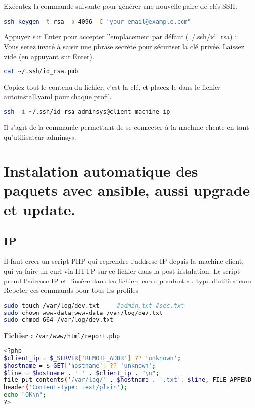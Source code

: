 \documentclass[a4paper,12pt]{article}
\begin{document}
\newline
Exécutez la commande suivante pour générer une nouvelle paire de clés SSH:
\begin{lstlisting}[language=bash]
ssh-keygen -t rsa -b 4096 -C "your_email@example.com"
\end{lstlisting}
Appuyez sur Enter pour accepter l'emplacement par défaut (~/.ssh/id\_rsa)
:
Vous serez invité à saisir une phrase secrète pour sécuriser la clé privée. Laissez vide (en appuyant sur Enter).
\begin{lstlisting}[language=bash]
cat ~/.ssh/id_rsa.pub
\end{lstlisting}
Copiez tout le contenu du fichier, c'est la clé, et placez-le dans le fichier autoinstall.yaml pour chaque profil.
\begin{lstlisting}[language=bash]
ssh -i ~/.ssh/id_rsa adminsys@client_machine_ip
\end{lstlisting}
Il s'agit de la commande permettant de se connecter à la machine cliente en tant qu'utilisateur adminsys.

\section{Instalation automatique des paquets avec ansible, aussi upgrade et update.}
\subsection{IP}
Il faut creer un script PHP qui reprendre l'addrese IP depuis la machine client, qui va faire un curl via HTTP sur ce fichier dans la post-instalation. Le script prend l'adresse IP et l'insère dans les fichiers correspondant au type d'utilisateurs
Repeter ces commands pour tous les profiles
\begin{lstlisting}[language=bash]
sudo touch /var/log/dev.txt     #admin.txt #sec.txt
sudo chown www-data:www-data /var/log/dev.txt
sudo chmod 664 /var/log/dev.txt
\end{lstlisting}

\textbf{Fichier :} \texttt{/var/www/html/report.php}
\begin{lstlisting}[language=bash]
<?php
$client_ip = $_SERVER['REMOTE_ADDR'] ?? 'unknown';
$hostname = $_GET['hostname'] ?? 'unknown';
$line = $hostname . ' ' . $client_ip . "\n";
file_put_contents('/var/log/' . $hostname . '.txt', $line, FILE_APPEND | LOCK_EX);
header('Content-Type: text/plain');
echo "OK\n";
?>
\end{lstlisting}
\end{document}
